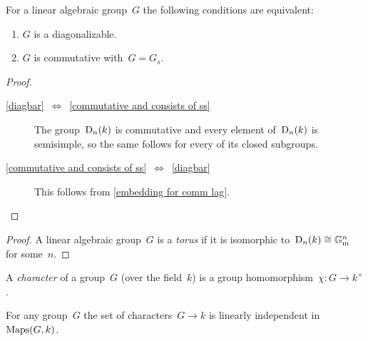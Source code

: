 \begin{lemma}
  For a linear algebraic group~$G$ the following conditions are equivalent:
  \begin{enumerate}
    \item
      \label{diagbar}
      $G$ is a diagonalizable.
    \item
      \label{commutative and consists of ss}
      $G$ is commutative with~$G = G_s$.
  \end{enumerate}
\end{lemma}


\begin{proof}
  \leavevmode
  \begin{description}
    \item[\ref*{diagbar}~$\iff$~\ref*{commutative and consists of ss}]
      The group~$\operatorname{D}_n(k)$ is commutative and every element of~$\operatorname{D}_n(k)$ is semisimple, so the same follows for every of its closed subgroups.
    \item[\ref*{commutative and consists of ss}~$\iff$~\ref{diagbar}]
      This follows from \cref{embedding for comm lag}.
    \qedhere
  \end{description}
\end{proof}


\begin{proof}
  A linear algebraic group~$G$ is a \emph{torus} if it is isomorphic to~$\operatorname{D}_n(k) \cong \mathbb{G}_{\text{m}}^n$ for some~$n$.
\end{proof}


\begin{definition}
  A \emph{character} of a group~$G$ (over the field~$k$) is a group homomorphism~$\chi \colon G \to k^\times$.
\end{definition}


\begin{lemma}
  \label{dedekind artin lemma}
  For any group~$G$ the set of characters~$G \to k$ is linearly independent in~$\operatorname{Maps}(G,k)$.
\end{lemma}


